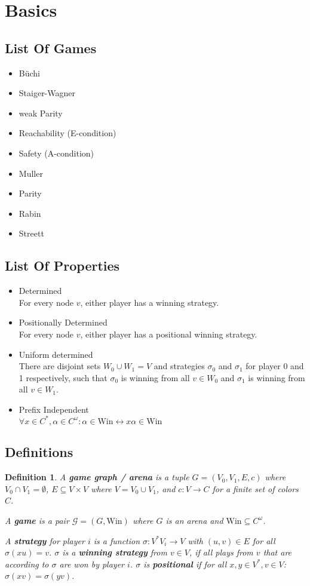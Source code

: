 \documentclass{article}
\newtheorem{definition}{Definition}
\begin{document}
\section{Basics}
\subsection{List Of Games}
\begin{itemize}
	\item Büchi
	\item Staiger-Wagner
	\item weak Parity
	\item Reachability (E-condition)
	\item Safety (A-condition)
	\item Muller
	\item Parity
	\item Rabin
	\item Streett
\end{itemize}

\subsection{List Of Properties}
\begin{itemize}
	\item Determined \\
		For every node $v$, either player has a winning strategy.
	\item Positionally Determined \\
		For every node $v$, either player has a positional winning strategy.
	\item Uniform determined \\
		There are disjoint sets $W_0 \cup W_1 = V$ and strategies $\sigma_0$ and $\sigma_1$ for player 0 and 1 respectively, such that $\sigma_0$ is winning from all $v \in W_0$ and $\sigma_1$ is winning from all $v \in W_1$.
	\item Prefix Independent \\
		$\forall x \in C^*, \alpha \in C^\omega: \alpha \in \text{Win} \leftrightarrow x \alpha \in \text{Win}$
\end{itemize}

\subsection{Definitions}
\begin{definition}
	A \textbf{game graph / arena} is a tuple $G = (V_0, V_1, E, c)$ where $V_0 \cap V_1 = \emptyset$, $E \subseteq V \times V$ where $V = V_0 \cup V_1$, and $c : V \rightarrow C$ for a finite set of colors $C$.
	
	A \textbf{game} is a pair $\mathcal{G} = (G, \text{Win})$ where $G$ is an arena and $\text{Win} \subseteq C^\omega$.
	
	A \textbf{strategy} for player $i$ is a function $\sigma : V^* V_i \rightarrow V$ with $(u, v) \in E$ for all $\sigma(xu) = v$. $\sigma$ is a \textbf{winning strategy} from $v \in V$, if all plays from $v$ that are according to $\sigma$ are won by player $i$. $\sigma$ is \textbf{positional} if for all $x, y \in V^*, v \in V$: $\sigma(xv) = \sigma(yv)$.
\end{definition}
\end{document}
